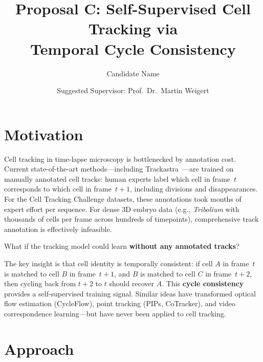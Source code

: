 \documentclass{article}
\title{Proposal C: Self-Supervised Cell Tracking via\\Temporal Cycle Consistency}
\author{Candidate Name}
\date{Suggested Supervisor: Prof.\ Dr.\ Martin Weigert}
\begin{document}
\maketitle

\section*{Motivation}

Cell tracking in time-lapse microscopy is bottlenecked by annotation cost. Current state-of-the-art methods---including Trackastra~\cite{trackastra}---are trained on manually annotated cell tracks: human experts label which cell in frame~$t$ corresponds to which cell in frame~$t{+}1$, including divisions and disappearances. For the Cell Tracking Challenge datasets, these annotations took months of expert effort per sequence. For dense 3D embryo data (e.g., \textit{Tribolium} with thousands of cells per frame across hundreds of timepoints), comprehensive track annotation is effectively infeasible.

What if the tracking model could learn \textbf{without any annotated tracks}?

The key insight is that cell identity is temporally consistent: if cell $A$ in frame~$t$ is matched to cell $B$ in frame~$t{+}1$, and $B$ is matched to cell $C$ in frame~$t{+}2$, then cycling back from $t{+}2$ to $t$ should recover $A$. This \textbf{cycle consistency} provides a self-supervised training signal. Similar ideas have transformed optical flow estimation (CycleFlow), point tracking (PIPs, CoTracker), and video correspondence learning---but have never been applied to cell tracking.

\section*{Approach}
\end{document}
